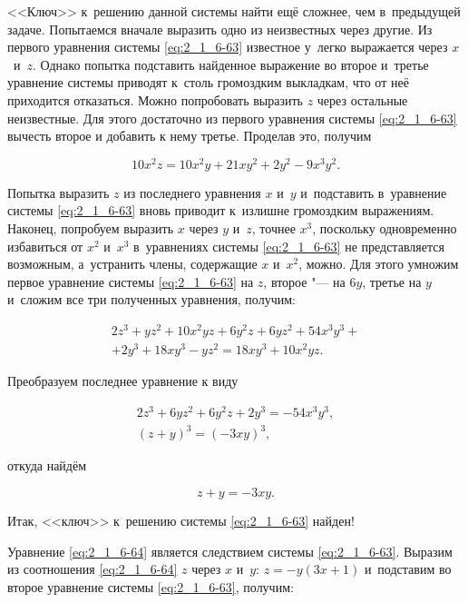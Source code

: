 <<Ключ>> к~решению данной системы найти ещё сложнее, чем в~предыдущей задаче.
Попытаемся вначале выразить одно из неизвестных через другие. Из первого уравнения
системы \eqref{eq:2_1_6-63} известное $у$~легко выражается через $x$~и~$z$.
Однако попытка подставить найденное выражение во второе и~третье уравнение
системы приводят к~столь громоздким выкладкам, что от неё приходится
отказаться. Можно попробовать выразить $z$ через остальные неизвестные.
Для этого достаточно из первого уравнения системы \eqref{eq:2_1_6-63}
вычесть второе и добавить к нему третье. Проделав это, получим

\begin{equation*}
10x^{2}z = 10x^{2}y + 21xy^{2} + 2y^{2} - 9x^{3}y^{2}. 
\end{equation*}

Попытка выразить $z$ из последнего уравнения $x$ и~$y$ и~подставить
в~уравнение системы \eqref{eq:2_1_6-63} вновь приводит к~излишне громоздким
выражениям. Наконец, попробуем выразить $x$ через $y$ и~$z$, точнее $x^{3}$,
поскольку одновременно избавиться от $x^{2}$ и~$x^{3}$ в~уравнениях системы
\eqref{eq:2_1_6-63} не представляется возможным, а~устранить члены, содержащие
$x$ и~$x^{2}$, можно. Для этого умножим первое уравнение системы
\eqref{eq:2_1_6-63} на $z$, второе "--- на $6y$, третье на $y$
и~сложим все три полученных уравнения, получим:

\begin{multline*}
2z^{3} + yz^{2} + 10x^{2}yz + 6y^{2}z + 6yz^{2} + 54 x^{3}y^{3} + \\
+ 2y^{3} + 18xy^{3} - yz^{2} = 18xy^{3} + 10x^{2}yz.
\end{multline*}

\noindent
Преобразуем последнее уравнение к виду

\begin{gather*}
2z^{3} + 6yz^{2} + 6y^{2}z + 2y^{3} = -54x^{3}y^{3}, \\
(z + y)^{3} = (-3xy)^{3},
\end{gather*}

\noindent
откуда найдём

\begin{equation}\label{eq:2_1_6-64}
z + y = -3xy.
\end{equation}

Итак, <<ключ>> к~решению системы \eqref{eq:2_1_6-63} найден!

Уравнение \eqref{eq:2_1_6-64} является следствием системы \eqref{eq:2_1_6-63}.
Выразим из соотношения \eqref{eq:2_1_6-64} $z$ через $x$ и~$y$:
$z = -y(3x + 1)$ и~подставим во второе уравнение системы \eqref{eq:2_1_6-63},
получим:

